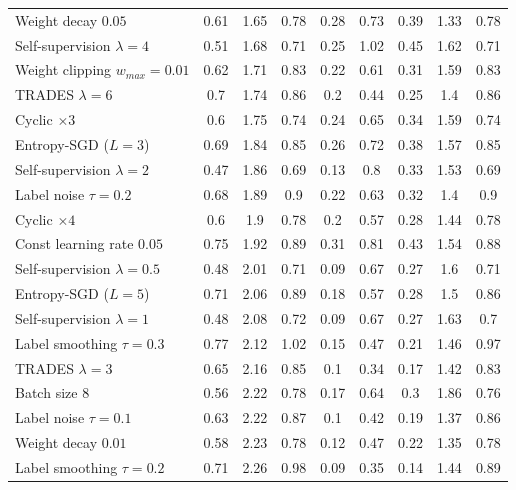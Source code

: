 \begin{table}[t]
{\begin{tabularx}{\textwidth}{|X|c|c|c||c|c|c||c|c|}
		Weight decay $0.05$ & 0.61 & 1.65 & 0.78 & 0.28 & 0.73 & 0.39 & 1.33 & 0.78\\
		Self-supervision $\lambda{=}4$ & 0.51 & 1.68 & 0.71 & 0.25 & 1.02 & 0.45 & 1.62 & 0.71\\
		Weight clipping $w_{max}{=}0.01$ & 0.62 & 1.71 & 0.83 & 0.22 & 0.61 & 0.31 & 1.59 & 0.83\\
		TRADES $\lambda{=}6$ & 0.7 & 1.74 & 0.86 & 0.2 & 0.44 & 0.25 & 1.4 & 0.86\\
		Cyclic $\times3$ & 0.6 & 1.75 & 0.74 & 0.24 & 0.65 & 0.34 & 1.59 & 0.74\\
		Entropy-SGD ($L{=}3$) & 0.69 & 1.84 & 0.85 & 0.26 & 0.72 & 0.38 & 1.57 & 0.85\\
		Self-supervision $\lambda{=}2$ & 0.47 & 1.86 & 0.69 & 0.13 & 0.8 & 0.33 & 1.53 & 0.69\\
		
		Label noise $\tau{=}0.2$ & 0.68 & 1.89 & 0.9 & 0.22 & 0.63 & 0.32 & 1.4 & 0.9\\
		Cyclic $\times4$ & 0.6 & 1.9 & 0.78 & 0.2 & 0.57 & 0.28 & 1.44 & 0.78\\
		Const learning rate $0.05$ & 0.75 & 1.92 & 0.89 & 0.31 & 0.81 & 0.43 & 1.54 & 0.88\\
		Self-supervision $\lambda{=}0.5$ & 0.48 & 2.01 & 0.71 & 0.09 & 0.67 & 0.27 & 1.6 & 0.71\\
		Entropy-SGD ($L{=}5$) & 0.71 & 2.06 & 0.89 & 0.18 & 0.57 & 0.28 & 1.5 & 0.86\\
		Self-supervision $\lambda{=}1$ & 0.48 & 2.08 & 0.72 & 0.09 & 0.67 & 0.27 & 1.63 & 0.7\\
		Label smoothing $\tau{=}0.3$ & 0.77 & 2.12 & 1.02 & 0.15 & 0.47 & 0.21 & 1.46 & 0.97\\
		TRADES $\lambda{=}3$ & 0.65 & 2.16 & 0.85 & 0.1 & 0.34 & 0.17 & 1.42 & 0.83\\
		Batch size $8$ & 0.56 & 2.22 & 0.78 & 0.17 & 0.64 & 0.3 & 1.86 & 0.76\\
		Label noise $\tau{=}0.1$ & 0.63 & 2.22 & 0.87 & 0.1 & 0.42 & 0.19 & 1.37 & 0.86\\
		Weight decay $0.01$ & 0.58 & 2.23 & 0.78 & 0.12 & 0.47 & 0.22 & 1.35 & 0.78\\
		Label smoothing $\tau{=}0.2$ & 0.71 & 2.26 & 0.98 & 0.09 & 0.35 & 0.14 & 1.44 & 0.89\\
		

\end{tabularx}}
\end{table}
